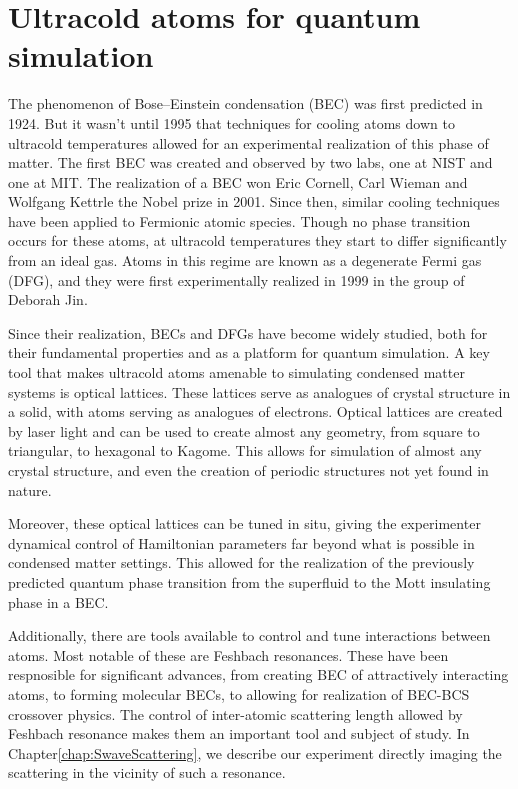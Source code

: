 \section{Ultracold atoms for quantum simulation}
The phenomenon of Bose--Einstein condensation (BEC) was first predicted in 1924\cite{Bose1924}. But it wasn't until 1995 that techniques for cooling atoms down to ultracold temperatures allowed for an experimental realization of this phase of matter. The first BEC was created and observed by two labs, one at NIST\cite{Anderson1995} and one at MIT\cite{Davis1995}. The realization of a BEC won Eric Cornell, Carl Wieman and Wolfgang Kettrle the Nobel prize in 2001. Since then, similar cooling techniques have been applied to Fermionic atomic species. Though no phase transition occurs for these atoms, at ultracold temperatures they start to differ significantly from an ideal gas. Atoms in this regime are known as a degenerate Fermi gas (DFG), and they were first experimentally realized in 1999 in the group of Deborah Jin\cite{DeMarcoJin99,Truscott2001}. 

Since their realization, BECs and DFGs have become widely studied, both for their fundamental properties and as a platform for quantum simulation. A key tool that makes ultracold atoms amenable to simulating condensed matter systems is optical lattices. These lattices serve as analogues of crystal structure in a solid, with atoms serving as analogues of electrons. Optical lattices are created by laser light and can be used to create almost any geometry, from square\cite{Greiner2001} to triangular\cite{Becker2010,Struck2011}, to hexagonal\cite{Tarruell2012} to Kagome\cite{Liu2010}. This allows for simulation of almost any crystal structure, and even the creation of periodic structures not yet found in nature. 

Moreover, these optical lattices can be tuned in situ, giving the experimenter dynamical control of Hamiltonian parameters far beyond what is possible in condensed matter settings. This allowed for the realization of the previously predicted \cite{Fisher1989} quantum phase transition from the superfluid to the Mott insulating phase in a BEC\cite{Greiner2002,Mun2008}.

Additionally, there are tools available to control and tune interactions between atoms. Most notable of these are Feshbach resonances\cite{Fano1935,Fano1961,Feshbach1958,Feshbach1962,Chin10}. These have been respnosible for significant advances, from creating BEC of attractively interacting atoms\cite{Cornish00}, to forming molecular BECs\cite{Jochim03,Zwierlein03,Regal04}, to allowing for realization of BEC-BCS crossover physics\cite{Greiner03,Bourdel04, Regal04}. The control of inter-atomic scattering length allowed by Feshbach resonance makes them an important tool and subject of study. In Chapter\ref{chap:SwaveScattering}, we describe our experiment directly imaging the scattering in the vicinity of such a resonance. 

